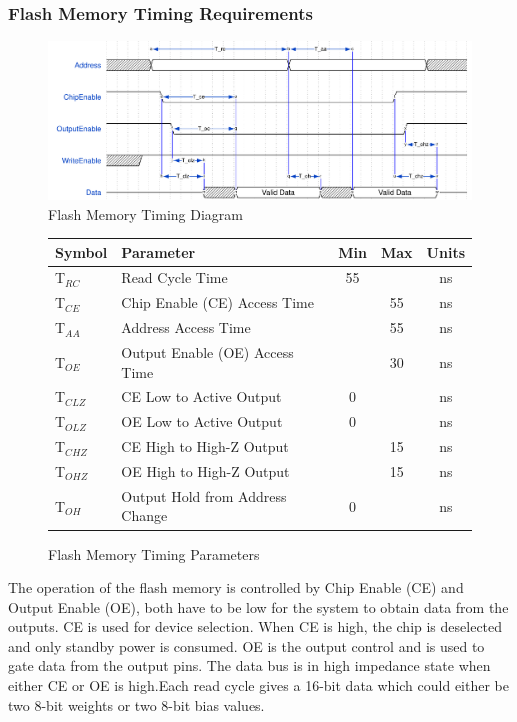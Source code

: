 \documentclass[12pt]{article}
\begin{document}
\subsubsection{Flash Memory Timing Requirements}
\begin{figure}[H]
  \centering
  \includegraphics[width=\textwidth]{flash_timing.pdf}
  \caption{Flash Memory Timing Diagram}
\end{figure}

\begin{figure}[H]
  \centering
  \begin{tabular}[H]{|l|l|c|c|c|}
    \hline
    Symbol & Parameter & Min & Max & Units \\ \hline \hline
    T$_{RC}$ & Read Cycle Time & 55 & & ns \\\hline
    T$_{CE}$ & Chip Enable (CE) Access Time & & 55 & ns \\ \hline
    T$_{AA}$ & Address Access Time & & 55 & ns \\ \hline
    T$_{OE}$ & Output Enable (OE) Access Time & & 30 & ns \\ \hline
    T$_{CLZ}$ & CE Low to Active Output & 0  & & ns \\ \hline
    T$_{OLZ}$ & OE Low to Active Output & 0 & & ns \\ \hline
    T$_{CHZ}$ & CE High to High-Z Output & & 15 & ns \\ \hline
    T$_{OHZ}$ & OE High to High-Z Output & & 15 & ns \\ \hline
    T$_{OH}$ & Output Hold from Address Change & 0 & & ns \\ \hline
  \end{tabular}
  \caption{Flash Memory Timing Parameters}
\end{figure}
The operation of the flash memory is controlled by Chip Enable (CE) and Output Enable (OE), both have to be low for the system to obtain data from the outputs. CE is used for device selection. When CE is high, the chip is deselected and only standby power is consumed. OE is the output control and is used to gate data from the output pins. The data bus is in high impedance state when either CE or OE is high.Each read cycle gives a 16-bit data which could either be two 8-bit weights or two 8-bit  bias values.
\newpage
\end{document}
